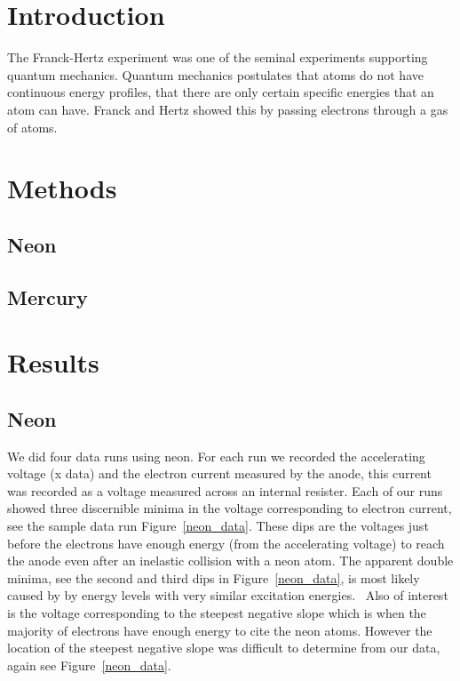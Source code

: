 \documentclass[prb,preprint]{revtex4-1}
\begin{document}
\section{Introduction} 

The Franck-Hertz experiment was one of the seminal experiments supporting quantum mechanics. Quantum mechanics postulates that atoms do not have continuous energy profiles, that there are only certain specific energies that an atom can have. Franck and Hertz showed this by passing electrons through a gas of atoms.

\section{Methods}

\subsection{Neon}
\subsection{Mercury}


\section{Results}

\subsection{Neon}

We did four data runs using neon. For each run we recorded the accelerating voltage (x data) and the electron current measured by the anode, this current was recorded as a voltage measured across an internal resister. Each of our runs showed three discernible minima in the voltage corresponding to electron current, see the sample data run Figure~\ref{neon_data}. These dips are the voltages just before the electrons have enough energy (from the accelerating voltage) to reach the anode even after an inelastic collision with a neon atom. The apparent double minima, see the second and third dips in Figure~\ref{neon_data}, is most likely caused by by energy levels with very similar excitation energies.~\cite{newfeatures} Also of interest is the voltage corresponding to the steepest negative slope which is when the majority of electrons have enough energy to cite the neon atoms. However the location of the steepest negative slope was difficult to determine from our data, again see Figure~\ref{neon_data}.
\end{document}
